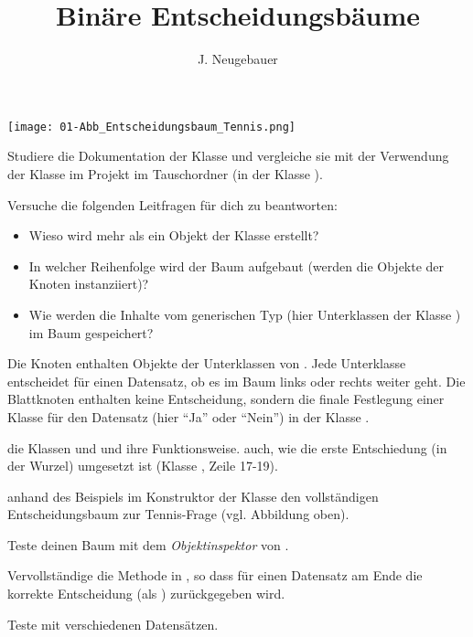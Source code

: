 \documentclass[10pt, a4paper]{scrartcl}
\author{J. Neugebauer}
\title{Binäre Entscheidungsbäume}
\date{\Heute}
\begin{document}
\ReiheTitel

\begin{center}
	\texttt{[image: 01-Abb\_Entscheidungsbaum\_Tennis.png]}
\end{center}

\begin{aufgabe}
	Studiere die Dokumentation der Klasse  und vergleiche sie mit der Verwendung der Klasse im Projekt  im Tauschordner (in der Klasse ).
	
	Versuche die folgenden Leitfragen für dich zu beantworten:
	\begin{itemize}
		\item Wieso wird mehr als ein Objekt der Klasse  erstellt?
		\item In welcher Reihenfolge wird der Baum aufgebaut (werden die Objekte der Knoten instanziiert)?
		\item Wie werden die Inhalte vom generischen Typ  (hier Unterklassen der Klasse ) im Baum gespeichert?
	\end{itemize}
\end{aufgabe}

\begin{aufgabe}
	Die Knoten enthalten Objekte der Unterklassen von . Jede Unterklasse entscheidet für einen Datensatz, ob es im Baum links oder rechts weiter geht. Die Blattknoten enthalten keine Entscheidung, sondern die finale Festlegung einer Klasse für den Datensatz (hier \enquote{Ja} oder \enquote{Nein}) in der Klasse .
	
	 die Klassen  und  und  ihre Funktionsweise.  auch, wie die erste Entschiedung (in der Wurzel) umgesetzt ist (Klasse , Zeile 17-19). 
\end{aufgabe}

\begin{aufgabe}
	 anhand des Beispiels im Konstruktor der Klasse  den vollständigen Entscheidungsbaum zur Tennis-Frage (vgl. Abbildung oben).
	
	Teste deinen Baum mit dem \emph{Objektinspektor} von .
\end{aufgabe}

\begin{aufgabe}
	Vervollständige die Methode  in , so dass für einen Datensatz am Ende die korrekte Entscheidung (als ) zurückgegeben wird.
	
	Teste mit verschiedenen Datensätzen.
\end{aufgabe}
\end{document}

